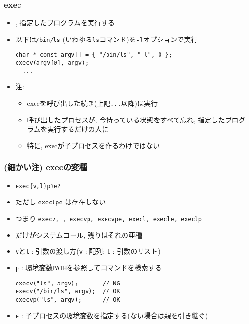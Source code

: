 \documentclass[12pt,dvipdfmx]{beamer}
\begin{document}
\begin{frame}[fragile]
  \frametitle{exec}
  \begin{itemize}
  \item {}, 指定したプログラムを実行する
  \item 以下は{\tt /bin/ls} (いわゆる{\tt ls}コマンド)を{\tt -l}オプションで実行
\begin{lstlisting}
char * const argv[] = { "/bin/ls", "-l", 0 };
execv(argv[0], argv);
  ...
\end{lstlisting}
\item 注:
  \begin{itemize}
  \item execを呼び出した続き(上記{\tt ...}以降)は実行
  \item 呼び出したプロセスが, 今持っている状態をすべて忘れ,
    指定したプログラムを実行するだけの人に
  \item 特に, execが子プロセスを作るわけではない
  \end{itemize}
\end{itemize}
\end{frame}

\begin{frame}[fragile]
  \frametitle{{\small (細かい注)} execの変種}
  \begin{itemize}
  \item {\tt exec\{v,l\}p?e?}
  \item ただし {\tt execlpe} は存在しない
  \item つまり {\tt execv, , execvp, execvpe, execl, execle, execlp}
  \item {}だけがシステムコール, 残りはそれの亜種
  \item {\tt v}と{\tt l} : 引数の渡し方({\tt v} : 配列; {\tt l} : 引数のリスト)
  \item {\tt p} : 環境変数{\tt PATH}を参照してコマンドを検索する
    \begin{lstlisting}
execv("ls", argv);       // NG
execv("/bin/ls", argv);  // OK
execvp("ls", argv);      // OK
    \end{lstlisting}
  \item {\tt e} : 子プロセスの環境変数を指定する(ない場合は親を引き継ぐ)
  \end{itemize}
\end{frame}
\end{document}
